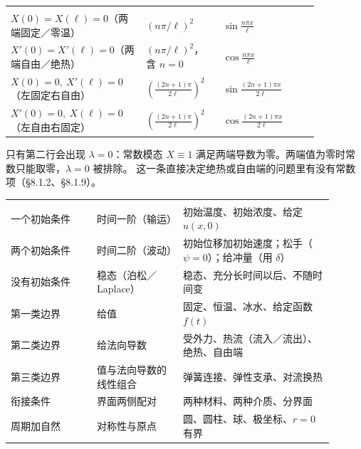 \begin{center}
\tabtop
\begin{tabular}{@{}L{0.36\linewidth}L{0.22\linewidth}L{0.28\linewidth}@{}}
 &  &  \\
\tabmidrule
$X(0)=X(\ell)=0$（两端固定／零温） & $(n\pi/\ell)^2$ & $\sin\frac{n\pi x}{\ell}$ \\
$X'(0)=X'(\ell)=0$（两端自由／绝热） & $(n\pi/\ell)^2$，含 $n=0$ & $\cos\frac{n\pi x}{\ell}$ \\
$X(0)=0,\ X'(\ell)=0$（左固定右自由） & $\left(\frac{(2n+1)\pi}{2\ell}\right)^2$ & $\sin\frac{(2n+1)\pi x}{2\ell}$ \\
$X'(0)=0,\ X(\ell)=0$（左自由右固定） & $\left(\frac{(2n+1)\pi}{2\ell}\right)^2$ & $\cos\frac{(2n+1)\pi x}{2\ell}$ \\
\end{tabular}
\tabbot
\end{center}

只有第二行会出现 $\lambda=0$：常数模态 $X\equiv1$ 满足两端导数为零。两端值为零时常数只能取零，$\lambda=0$ 被排除。
这一条直接决定绝热或自由端的问题里有没有常数项（§8.1.2、§8.1.9）。


\begin{center}
\tabtop
\begin{tabular}{@{}L{0.24\linewidth}L{0.24\linewidth}L{0.42\linewidth}@{}}
 &  &  \\
\tabmidrule
一个初始条件 & 时间一阶（输运） & 初始温度、初始浓度、给定 $u(x,0)$ \\
两个初始条件 & 时间二阶（波动） & 初始位移加初始速度；松手（$\psi=0$）；给冲量（用 $\delta$） \\
没有初始条件 & 稳态（泊松／Laplace） & 稳态、充分长时间以后、不随时间变 \\
第一类边界 & 给值 & 固定、恒温、冰水、给定函数 $f(t)$ \\
第二类边界 & 给法向导数 & 受外力、热流（流入／流出）、绝热、自由端 \\
第三类边界 & 值与法向导数的线性组合 & 弹簧连接、弹性支承、对流换热 \\
衔接条件 & 界面两侧配对 & 两种材料、两种介质、分界面 \\
周期加自然 & 对称性与原点 & 圆、圆柱、球、极坐标、$r=0$ 有界 \\
\end{tabular}
\tabbot
\end{center}

